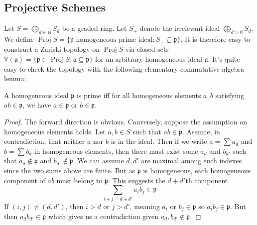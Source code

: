 \documentclass[12pt,letter]{article}
\newcommand{\Proj}[0]{\operatorname{Proj}}
\begin{document}
	\subsection{Projective Schemes}\label{ssec-proj-scheme}
	Let $S=\bigoplus_{d\in\mathbb N} S_d$ be a graded ring. Let $S_+$ denote the irrelevant ideal $\bigoplus_{d>0} S_d$. We define $\Proj S=\{\mathfrak p\text{ homogeneous prime ideal}:S_+\subsetneq \mathfrak p\}$. It is therefore easy to construct a Zariski topology on $\Proj S$ via closed sets $\mathbb V(\mathfrak a)=\{\mathfrak p\in\Proj S:\mathfrak a\subseteq\mathfrak p\}$ for an arbitrary homogeneous ideal $\mathfrak a$. It's quite easy to check the topology with the following elementary commutative algebra lemma:
	\begin{lemma}\label{l251}
		A homogeneous ideal $\mathfrak p$ is prime iff for all homogeneous elements $a, b$ satisfying $ab\in\mathfrak p$, we have $a\in\mathfrak p$ or $b\in\mathfrak p$.
	\end{lemma}
	\begin{proof}
		The forward direction is obvious. Conversely, suppose the assumption on homogeneous elements holds. Let $a, b\in S$ such that $ab\in\mathfrak p$. Assume, in contradiction, that neither $a$ nor $b$ is in the ideal. Then if we write $a=\sum a_d$ and $b=\sum b_d$ in homogeneous elements, then there must exist some $a_d$ and $b_{d'}$ such that $a_d\notin\mathfrak p$ and $b_{d'}\notin\mathfrak p$. We can assume $d, d'$ are maximal among such indexes since the two sums above are finite. But as $\mathfrak p$ is homogeneous, each homogeneous component of $ab$ must belong to $\mathfrak p$. This suggests the $d+d'$th component
		\[\sum_{i+j=d+d'}a_ib_j\in\mathfrak p\]
		If $(i, j)\neq(d, d')$, then $i>d$ or $j>d'$, meaning $a_i$ or $b_j\in \mathfrak p$ so $a_ib_j\in\mathfrak p$. But then $a_db_{d'}\in\mathfrak p$ which gives us a contradiction given $a_d, b_{d'}\notin\mathfrak p$.
	\end{proof}
\end{document}

